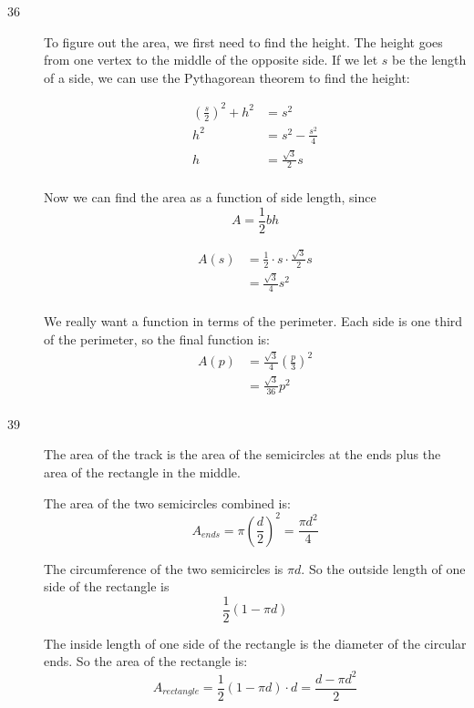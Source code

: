 \documentclass{exam}
\begin{document}
\ifprintanswers
\begin{description}
\item[36]
To figure out the area, we first need to find the height.  The height goes from one vertex to the middle of the opposite
side.  If we let $s$ be the length of a side, we can use the Pythagorean theorem to find the height:

\begin{align*}
  \left( \frac{s}{2} \right)^2 + h^2 &= s^2 \\
  h^2 &= s^2 - \frac{s^2}{4} \\
  h &= \frac{\sqrt{3}}{2} s \\
\end{align*}

Now we can find the area as a function of side length, since 
\[
  A = \frac{1}{2} bh
\]

\begin{align*}
  A(s) &= \frac{1}{2} \cdot s \cdot \frac{\sqrt{3}}{2} s \\
       &= \frac{\sqrt{3}}{4} s^2 \\
\end{align*}


We really want a function in terms of the perimeter.  Each side is one third of the perimeter, so the final
function is:
\begin{align*}
  A(p) &= \frac{\sqrt{3}}{4} \left( \frac{p}{3} \right)^2 \\
       &= \frac{\sqrt{3}}{36} p^2 \\
\end{align*}

\item[39]
The area of the track is the area of the semicircles at the ends plus the area of the rectangle in the middle.  

The area of the two semicircles combined is:
\[
  A_{ends} = \pi \left(\frac{d}{2}\right)^2 = \frac{\pi d^2}{4}
\]

The circumference of the two semicircles is $\pi d$.  So the outside length of one side of the rectangle is 
\[
  \frac{1}{2} (1 - \pi d)
\]

The inside length of one side of the rectangle is the diameter of the circular ends.  So the area of the rectangle is:
\[
  A_{rectangle} = \frac{1}{2} (1 - \pi d) \cdot d = \frac{d - \pi d^2}{2}
\]


\end{description}
\end{document}
